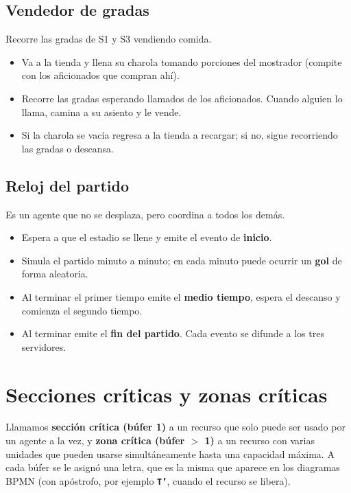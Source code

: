 \documentclass[11pt,letterpaper]{article}
\newcommand{\buf}[1]{\textbf{\texttt{#1}}}
\begin{document}
\subsection{Vendedor de gradas}
Recorre las gradas de S1 y S3 vendiendo comida.
\begin{itemize}
  \item Va a la tienda y llena su charola tomando porciones del mostrador (compite con los aficionados que compran ahí).
  \item Recorre las gradas esperando llamados de los aficionados. Cuando alguien lo llama, camina a su asiento y le vende.
  \item Si la charola se vacía regresa a la tienda a recargar; si no, sigue recorriendo las gradas o descansa.
\end{itemize}

\subsection{Reloj del partido}
Es un agente que no se desplaza, pero coordina a todos los demás.
\begin{itemize}
  \item Espera a que el estadio se llene y emite el evento de \textbf{inicio}.
  \item Simula el partido minuto a minuto; en cada minuto puede ocurrir un \textbf{gol} de forma aleatoria.
  \item Al terminar el primer tiempo emite el \textbf{medio tiempo}, espera el descanso y comienza el segundo tiempo.
  \item Al terminar emite el \textbf{fin del partido}. Cada evento se difunde a los tres servidores.
\end{itemize}

\section{Secciones críticas y zonas críticas}

Llamamos \textbf{sección crítica (búfer 1)} a un recurso que solo puede ser usado por un agente a la vez, y \textbf{zona crítica (búfer $>$ 1)} a un recurso con varias unidades que pueden usarse simultáneamente hasta una capacidad máxima. A cada búfer se le asignó una letra, que es la misma que aparece en los diagramas BPMN (con apóstrofo, por ejemplo \buf{T'}, cuando el recurso se libera).
\end{document}
